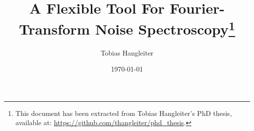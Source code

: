 \documentclass[
	a4paper, %
	fontsize=10pt, %
	twoside=false, %
	numbers=noenddot, %
	fontmethod=modern, %
	listing=minted
]{kaobook}
\begin{document}

\author{Tobias Hangleiter}
\title{A Flexible \python Tool For Fourier-Transform Noise Spectroscopy\thanks{This document has been extracted from Tobias Hangleiter's PhD thesis, available at: \url{https://github.com/thangleiter/phd_thesis}.}}
\date{\today}

\frontmatter
\maketitle


\begingroup %

\setlength{\textheight}{230\hscale} %

\etocclasstocstyle %
\etocstandardlines %

\tableofcontents %

\endgroup


\mainmatter %

\glsresetall %





\end{document}
